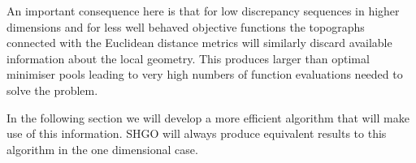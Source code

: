 An important consequence here is that for low discrepancy sequences in higher dimensions and for less well behaved objective functions the topographs connected with the Euclidean distance metrics will similarly discard available information about the local geometry. This produces larger than optimal minimiser pools leading to very high numbers of function evaluations needed to solve the problem.








In the following section we will develop a more efficient algorithm that will make use of this information. SHGO will always produce equivalent results to this algorithm in the one dimensional case.
